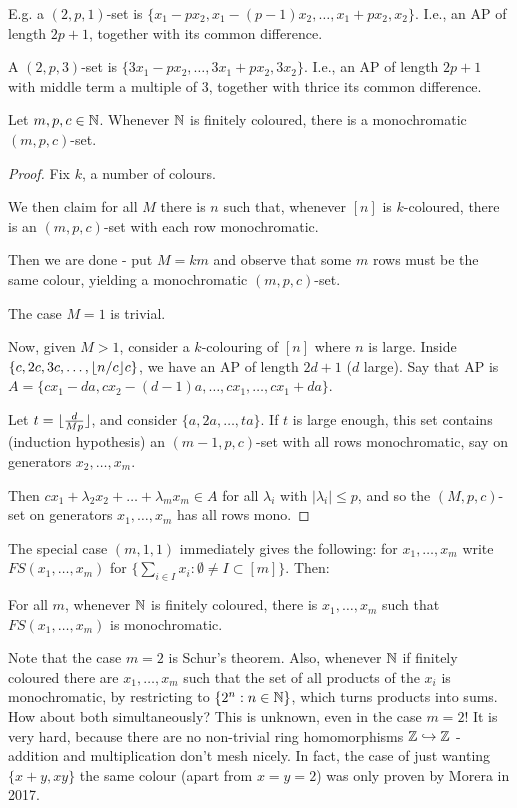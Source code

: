 \documentclass[10pt,a4paper]{article}
\begin{document}
E.g. a $(2,p,1)$-set is $\{x_1-px_2, x_1-(p-1)x_2, \ldots, x_1+px_2, x_2\}$. I.e., an AP of length $2p+1$, together with its common difference.

A $(2,p,3)$-set is $\{3x_1-px_2,\ldots, 3x_1+px_2, 3x_2\}$. I.e., an AP of length $2p+1$ with middle term a multiple of 3, together with thrice its common difference.

\begin{theorem}
  Let $m,p,c \in \mathbb{N}$. Whenever $\mathbb{N}$ is finitely coloured, there is a monochromatic $(m,p,c)$-set.
\end{theorem}
\begin{proof}
  Fix $k$, a number of colours.

  We then claim for all $M$ there is $n$ such that, whenever $[n]$ is $k$-coloured, there is an $(m,p,c)$-set with each row monochromatic.

  Then we are done - put $M = km$ and observe that some $m$ rows must be the same colour, yielding a monochromatic $(m,p,c)$-set.

  The case $M = 1$ is trivial.

  Now, given $M > 1$, consider a $k$-colouring of $[n]$ where $n$ is large. Inside $\{c, 2c, 3c, \ldots, \lfloor n/c \rfloor c\}$, we have an AP of length $2d+1$ ($d$ large). Say that AP is $A = \{cx_1-da, cx_2-(d-1)a, \ldots, cx_1, \ldots, cx_1+da\}$.

  Let $t = \lfloor \frac{d}{Mp} \rfloor$, and consider $\{a, 2a, \ldots, ta\}$. If $t$ is large enough, this set contains (induction hypothesis) an $(m-1, p, c)$-set with all rows monochromatic, say on generators $x_2, \ldots, x_m$.

  Then $cx_1 + \lambda_2 x_2 + \ldots +\lambda_m x_m \in A$ for all $\lambda_i$ with $|\lambda_i| \leq p$, and so the $(M,p,c)$-set on generators $x_1, \ldots, x_m$ has all rows mono.
\end{proof}
The special case $(m,1,1)$ immediately gives the following: for $x_1, \ldots, x_m$ write $FS(x_1, \ldots, x_m)$ for $\{\sum_{i \in I}x_i :\emptyset \neq I \subset [m]\}$. Then:
\begin{corollary}
  For all $m$, whenever $\mathbb{N}$ is finitely coloured, there is $x_1, \ldots, x_m$ such that $FS(x_1, \ldots, x_m)$ is monochromatic.
\end{corollary}
Note that the case $m=2$ is Schur's theorem. Also, whenever $\mathbb{N}$ if finitely coloured there are $x_1, \ldots, x_m$ such that the set of all products of the $x_i$ is monochromatic, by restricting to $\{2^n : n \in \mathbb{N}\}$, which turns products into sums. How about both simultaneously? This is unknown, even in the case $m=2$! It is very hard, because there are no non-trivial ring homomorphisms $\mathbb{Z} \hookrightarrow \mathbb{Z}$ - addition and multiplication don't mesh nicely. In fact, the case of just wanting $\{x+y, xy\}$ the same colour (apart from $x=y=2$) was only proven by Morera in 2017.
\end{document}
